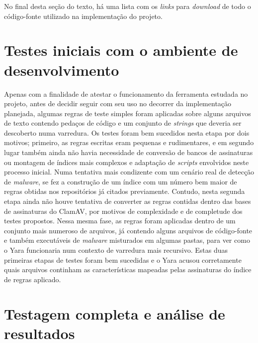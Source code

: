 No final desta seção do texto, há uma lista com os \textit{links} para
\textit{download} de todo o código-fonte utilizado na implementação do projeto.

\section{Testes iniciais com o ambiente de desenvolvimento}
\label{s.testesiniciais}

Apenas com a finalidade de atestar o funcionamento da ferramenta estudada no
projeto, antes de decidir seguir com seu uso no decorrer da implementação
planejada, algumas regras de teste simples foram aplicadas sobre alguns arquivos
de texto contendo pedaços de código e um conjunto de \textit{strings} que
deveria ser descoberto numa varredura. Os testes foram bem sucedidos nesta etapa
por dois motivos; primeiro, as regras escritas eram pequenas e rudimentares, e
em segundo lugar também ainda não havia necessidade de conversão de bancos de
assinaturas ou montagem de índices mais complexos e adaptação de
\textit{scripts} envolvidos neste processo inicial. Numa tentativa mais
condizente com um cenário real de detecção de \textit{malware}, se fez a
construção de um índice com um número bem maior de regras obtidas nos
repositórios já citados previamente. Contudo, nesta segunda etapa ainda não
houve tentativa de converter as regras contidas dentro das bases de assinaturas do
ClamAV, por motivos de complexidade e de completude dos testes propostos. Nessa
mesma fase, as regras foram aplicadas dentro de um conjunto mais numeroso de
arquivos, já contendo alguns arquivos de código-fonte e também executáveis de
\textit{malware} misturados em algumas pastas, para ver como o Yara funcionaria
num contexto de varredura mais recursivo. Estas duas primeiras etapas de testes
foram bem sucedidas e o Yara acusou corretamente quais arquivos continham as
características mapeadas pelas assinaturas do índice de regras aplicado.



\section{Testagem completa e análise de resultados}
\label{s.testefull}

